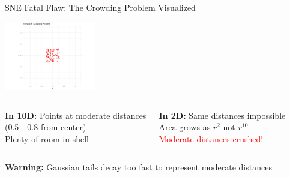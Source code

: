 \documentclass[aspectratio=169]{beamer}
\newcommand{\warning}[1]{\colorbox{red!10}{\textcolor{warningcolor}{\textbf{Warning:} #1}}}
\begin{document}
\begin{frame}{SNE Fatal Flaw: The Crowding Problem Visualized}
\begin{center}
\includegraphics[width=0.3\textwidth]{./Figures/crowding_problem_animation.png}
\end{center}

\begin{columns}
\textbf{In 10D:} Points at moderate distances\\
(0.5 - 0.8 from center)\\
Plenty of room in shell

\textbf{In 2D:} Same distances impossible\\
Area grows as $r^2$ not $r^{10}$\\
\textcolor{red}{Moderate distances crushed!}
\end{columns}

\warning{Gaussian tails decay too fast to represent moderate distances}
\end{frame}
\end{document}
